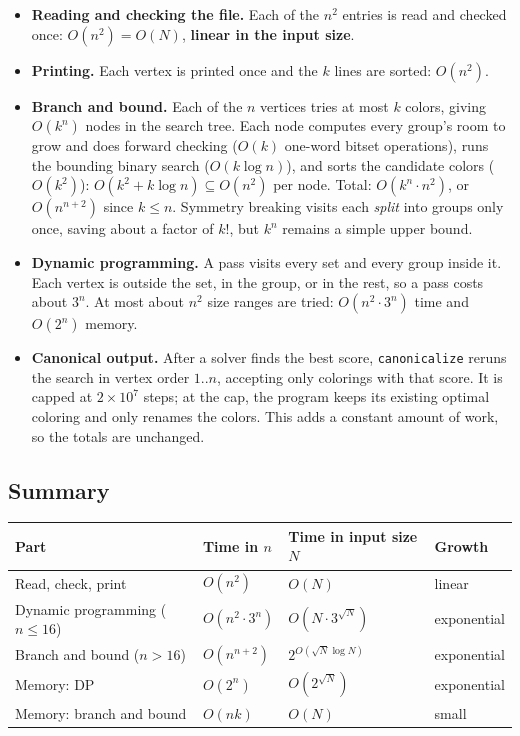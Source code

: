 \documentclass[11pt]{article}
\begin{document}
\begin{itemize}
  \item \textbf{Reading and checking the file.} Each of the $n^2$ entries is
        read and checked once: $O(n^2) = O(N)$, \textbf{linear in the input
        size}.
  \item \textbf{Printing.} Each vertex is printed once and the $k$ lines are
        sorted: $O(n^2)$.
  \item \textbf{Branch and bound.} Each of the $n$ vertices tries at most $k$
        colors, giving $O(k^n)$ nodes in the search tree. Each node computes
        every group's room to grow and does forward checking ($O(k)$ one-word
        bitset operations), runs the bounding binary search ($O(k\log n)$),
        and sorts the candidate colors ($O(k^2)$): $O(k^2 + k\log n)
        \subseteq O(n^2)$ per node. Total: $O(k^n \cdot n^2)$, or
        $O(n^{n+2})$ since $k \le n$. Symmetry breaking visits each \emph{split} into groups only
        once, saving about a factor of $k!$, but $k^n$ remains a simple upper
        bound.
  \item \textbf{Dynamic programming.} A pass visits every set and every group
        inside it. Each vertex is outside the set, in the group, or in the
        rest, so a pass costs about $3^n$. At most about $n^2$ size ranges are
        tried: $O(n^2 \cdot 3^n)$ time and $O(2^n)$ memory.
  \item \textbf{Canonical output.} After a solver finds the best score,
        \texttt{canonicalize} reruns the search in vertex order $1..n$,
        accepting only colorings with that score. It is capped at
        $2\times10^7$ steps; at the cap, the program keeps its existing
        optimal coloring and only renames the colors. This adds a constant
        amount of work, so the totals are unchanged.
\end{itemize}

\subsection{Summary}

\begin{center}
\begin{tabular}{@{}llll@{}}
\toprule
Part & Time in $n$ & Time in input size $N$ & Growth \\
\midrule
Read, check, print & $O(n^2)$ & $O(N)$ & linear \\
Dynamic programming ($n\le16$) & $O(n^2\cdot 3^n)$ & $O(N\cdot 3^{\sqrt N})$ & exponential \\
Branch and bound ($n>16$) & $O(n^{n+2})$ & $2^{O(\sqrt N \log N)}$ & exponential \\
\midrule
Memory: DP & $O(2^n)$ & $O(2^{\sqrt N})$ & exponential \\
Memory: branch and bound & $O(nk)$ & $O(N)$ & small \\
\bottomrule
\end{tabular}
\end{center}
\end{document}
